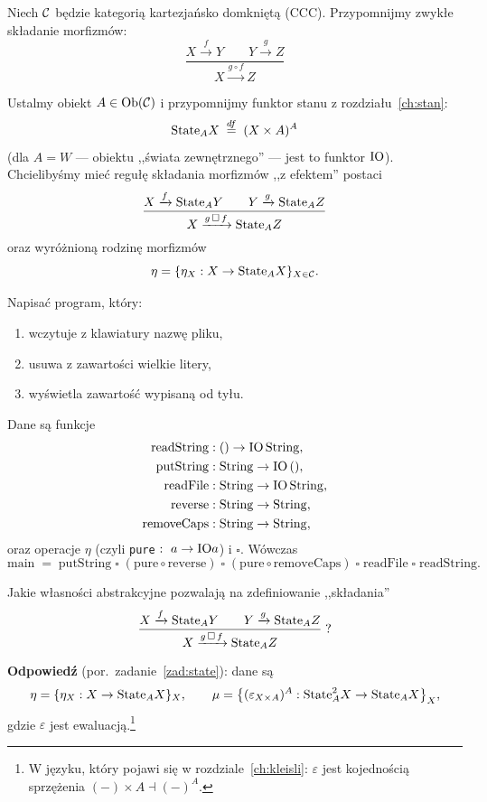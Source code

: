 Niech $\mathcal{C}$ będzie kategorią kartezjańsko domkniętą (CCC). Przypomnijmy zwykłe składanie morfizmów:
\[
\frac{X \xrightarrow{f} Y \qquad Y \xrightarrow{g} Z}{X \xrightarrow{g \circ f} Z}
\]

\begin{uwaga}
Ustalmy obiekt $A \in \mathrm{Ob}(\mathcal{C})$ i przypomnijmy funktor stanu z rozdziału~\ref{ch:stan}:
\[
\mathrm{State}_A X \;\stackrel{df}{=}\; (X \times A)^A
\]
(dla $A = W$ --- obiektu ,,świata zewnętrznego'' --- jest to funktor $\mathrm{IO}$). Chcielibyśmy mieć regułę składania morfizmów ,,z efektem'' postaci
\[
\frac{X \xrightarrow{f} \mathrm{State}_A Y \qquad Y \xrightarrow{g} \mathrm{State}_A Z}{X \xrightarrow{g \,\square\, f} \mathrm{State}_A Z}
\]
oraz wyróżnioną rodzinę morfizmów
\[
\eta = \{\eta_X : X \to \mathrm{State}_A X\}_{X \in \mathcal{C}}.
\]
\end{uwaga}

\begin{przyklad}
Napisać program, który:
\begin{enumerate}
\item wczytuje z klawiatury nazwę pliku,
\item usuwa z zawartości wielkie litery,
\item wyświetla zawartość wypisaną od tyłu.
\end{enumerate}

Dane są funkcje
\begin{align*}
\mathrm{readString} &: () \to \mathrm{IO}\,\mathrm{String}, \\
\mathrm{putString} &: \mathrm{String} \to \mathrm{IO}\,(), \\
\mathrm{readFile} &: \mathrm{String} \to \mathrm{IO}\,\mathrm{String}, \\
\mathrm{reverse} &: \mathrm{String} \to \mathrm{String}, \\
\mathrm{removeCaps} &: \mathrm{String} \to \mathrm{String},
\end{align*}
oraz operacje $\eta$ (czyli \texttt{pure} $:\ a \to \mathrm{IO} a$) i $\square$. Wówczas
\[
\mathrm{main} \;=\; \mathrm{putString} \;\square\; (\mathrm{pure} \circ \mathrm{reverse}) \;\square\; (\mathrm{pure} \circ \mathrm{removeCaps}) \;\square\; \mathrm{readFile} \;\square\; \mathrm{readString}.
\]
\end{przyklad}

\begin{uwaga}[Pytanie]
Jakie własności abstrakcyjne pozwalają na zdefiniowanie ,,składania''
\[
\frac{X \xrightarrow{f} \mathrm{State}_A Y \qquad Y \xrightarrow{g} \mathrm{State}_A Z}{X \xrightarrow{g \,\square\, f} \mathrm{State}_A Z} \;?
\]

\textbf{Odpowiedź} (por.\ zadanie~\ref{zad:state}): dane są
\[
\eta = \{\eta_X : X \to \mathrm{State}_A X\}_{X},
\qquad
\mu = \bigl\{(\varepsilon_{X \times A})^A : \mathrm{State}_A^2 X \to \mathrm{State}_A X\bigr\}_{X},
\]
gdzie $\varepsilon$ jest ewaluacją.\footnote{W języku, który pojawi się w rozdziale~\ref{ch:kleisli}: $\varepsilon$ jest kojednością sprzężenia $(-)\times A \dashv (-)^A$.}
\end{uwaga}

